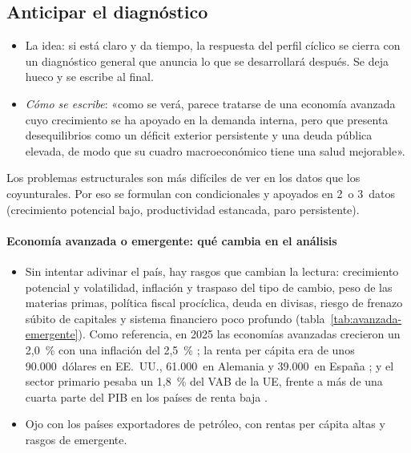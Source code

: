 \documentclass[11pt]{article}
\begin{document}
\subsection{Anticipar el diagnóstico}\label{sec:anticipar}

\begin{itemize}
\item La idea: si está claro y da tiempo, la respuesta del perfil cíclico se cierra con un diagnóstico general que anuncia lo que se desarrollará después. Se deja hueco y se escribe al final.
\item \emph{Cómo se escribe}: «como se verá, parece tratarse de una economía avanzada cuyo crecimiento se ha apoyado en la demanda interna, pero que presenta desequilibrios como un déficit exterior persistente y una deuda pública elevada, de modo que su cuadro macroeconómico tiene una salud mejorable».
\end{itemize}

\begin{notaopositor}
Los problemas estructurales son más difíciles de ver en los datos que los coyunturales. Por eso se formulan con condicionales y apoyados en 2~o 3~datos (crecimiento potencial bajo, productividad estancada, paro persistente).
\end{notaopositor}

\paragraph{Economía avanzada o emergente: qué cambia en el análisis}
\begin{itemize}
\item Sin intentar adivinar el país, hay rasgos que cambian la lectura: crecimiento potencial y volatilidad, inflación y traspaso del tipo de cambio, peso de las materias primas, política fiscal procíclica, deuda en divisas, riesgo de frenazo súbito de capitales y sistema financiero poco profundo (tabla~\ref{tab:avanzada-emergente}). Como referencia, en 2025 las economías avanzadas crecieron un 2,0~\% con una inflación del 2,5~\% \parencite{FMI2026WEO}; la renta per cápita era de unos 90.000~dólares en EE.~UU., 61.000~en Alemania y 39.000~en España \parencite{FMI2026WEO}; y el sector primario pesaba un 1,8~\% del VAB de la UE, frente a más de una cuarta parte del PIB en los países de renta baja \parencite{Eurostat2026nama10a10,BM2026WDI}.
\item Ojo con los países exportadores de petróleo, con rentas per cápita altas y rasgos de emergente.
\end{itemize}
\end{document}
